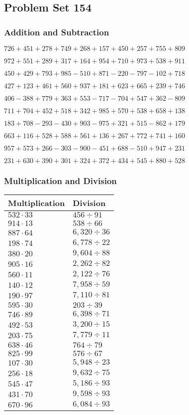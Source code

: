\hypertarget{problem-set-154}{%
\subsection{Problem Set 154}\label{problem-set-154}}

\hypertarget{addition-and-subtraction}{%
\subsubsection{Addition and
Subtraction}\label{addition-and-subtraction}}

\(726 +451 +278 +749 +268 +157 +450 +257 +755 +809\)

\(972 +551 +289 +317 +164 +954 +710 +973 +538 +911\)

\(450 +429 +793 +985 - 510 +871 - 220 - 797 - 102 +718\)

\(427 +123 +461 +560 +937 +181 +623 +665 +239 +746\)

\(406 - 388 +779 +363 +553 - 717 - 704 +547 +362 - 809\)

\(711 +704 +452 +518 +342 +985 +570 +538 +658 +138\)

\(183 +708 - 293 - 430 +903 - 975 +321 +515 - 862 +179\)

\(663 +116 +528 +588 +561 +136 +267 +772 +741 +160\)

\(957 +573 +266 - 303 - 900 - 451 +688 - 510 +947 +231\)

\(231 +630 +390 +301 +324 +372 +434 +545 +880 +528\)

\hypertarget{multiplication-and-division}{%
\subsubsection{Multiplication and
Division}\label{multiplication-and-division}}

\begin{longtable}[]{@{}ll@{}}
\toprule
Multiplication & Division\tabularnewline
\midrule
\endhead
\(532 \cdot 33\) & \(456÷91\)\tabularnewline
\(914 \cdot 13\) & \(538÷66\)\tabularnewline
\(887 \cdot 64\) & \(6,320÷36\)\tabularnewline
\(198 \cdot 74\) & \(6,778÷22\)\tabularnewline
\(380 \cdot 20\) & \(9,604÷88\)\tabularnewline
\(905 \cdot 16\) & \(2,262÷82\)\tabularnewline
\(560 \cdot 11\) & \(2,122÷76\)\tabularnewline
\(140 \cdot 12\) & \(7,958÷59\)\tabularnewline
\(190 \cdot 97\) & \(7,110÷81\)\tabularnewline
\(595 \cdot 30\) & \(203÷39\)\tabularnewline
\(746 \cdot 89\) & \(6,398÷71\)\tabularnewline
\(492 \cdot 53\) & \(3,200÷15\)\tabularnewline
\(203 \cdot 75\) & \(7,779÷11\)\tabularnewline
\(638 \cdot 46\) & \(764÷79\)\tabularnewline
\(825 \cdot 99\) & \(576÷67\)\tabularnewline
\(107 \cdot 30\) & \(5,948÷23\)\tabularnewline
\(256 \cdot 18\) & \(9,632÷75\)\tabularnewline
\(545 \cdot 47\) & \(5,186÷93\)\tabularnewline
\(431 \cdot 70\) & \(9,598÷93\)\tabularnewline
\(670 \cdot 96\) & \(6,084÷93\)\tabularnewline
\bottomrule
\end{longtable}
